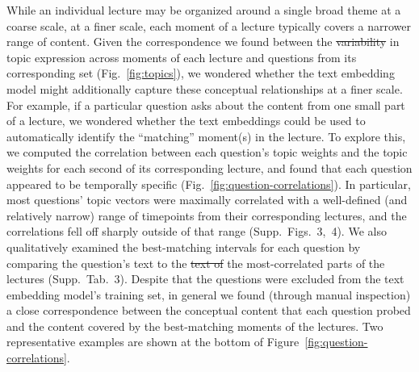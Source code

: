 \documentclass[10pt]{article}
\newcommand{\matchTab}{3}
\newcommand{\forcesCorrs}{3}
\newcommand{\bosCorrs}{4}
\providecommand{\DIFaddtex}[1]{{\protect\color{blue}\uwave{#1}}} %
\providecommand{\DIFdeltex}[1]{{\protect\color{red}\sout{#1}}}                      %
\providecommand{\DIFaddbegin}{} %
\providecommand{\DIFaddend}{} %
\providecommand{\DIFdelbegin}{} %
\providecommand{\DIFdelend}{} %
\providecommand{\DIFadd}[1]{\texorpdfstring{\DIFaddtex{#1}}{#1}} %
\providecommand{\DIFdel}[1]{\texorpdfstring{\DIFdeltex{#1}}{}} %
\newcommand{\DIFscaledelfig}{0.5}
\newlength{\DIFdelgraphicswidth} %
\newlength{\DIFdelgraphicsheight} %
\newcommand{\DIFaddincludegraphics}[2][]{{\color{blue}\fbox{\DIFOincludegraphics[#1]{#2}}}} %
\newcommand{\DIFdelincludegraphics}[2][]{%
\sbox{\DIFdelgraphicsbox}{\DIFOincludegraphics[#1]{#2}}%
\settoboxwidth{\DIFdelgraphicswidth}{\DIFdelgraphicsbox} %
\settoboxtotalheight{\DIFdelgraphicsheight}{\DIFdelgraphicsbox} %
\scalebox{\DIFscaledelfig}{%
\parbox[b]{\DIFdelgraphicswidth}{\usebox{\DIFdelgraphicsbox}\\[-\baselineskip] \rule{\DIFdelgraphicswidth}{0em}}\llap{\resizebox{\DIFdelgraphicswidth}{\DIFdelgraphicsheight}{%
\setlength{\unitlength}{\DIFdelgraphicswidth}%
\begin{picture}(1,1)%
\thicklines\linethickness{2pt} %
{\color[rgb]{1,0,0}\put(0,0){\framebox(1,1){}}}%
{\color[rgb]{1,0,0}\put(0,0){\line( 1,1){1}}}%
{\color[rgb]{1,0,0}\put(0,1){\line(1,-1){1}}}%
\end{picture}%
}\hspace*{3pt}}} %
} %
\DeclareRobustCommand{\DIFaddbegin}{\DIFOaddbegin \let\includegraphics\DIFaddincludegraphics} %
\DeclareRobustCommand{\DIFaddend}{\DIFOaddend \let\includegraphics\DIFOincludegraphics} %
\DeclareRobustCommand{\DIFdelbegin}{\DIFOdelbegin \let\includegraphics\DIFdelincludegraphics} %
\DeclareRobustCommand{\DIFdelend}{\DIFOaddend \let\includegraphics\DIFOincludegraphics} %
\begin{document}
While an individual lecture may be organized around a single broad theme at a
coarse scale, at a finer scale, each moment of a lecture typically covers a
narrower range of content. Given the correspondence we found between the
\DIFdelbegin \DIFdel{variability }\DIFdelend \DIFaddbegin \DIFadd{variabilities }\DIFaddend in topic expression across moments of each lecture and questions
from its corresponding set (Fig.~\ref{fig:topics}), we wondered whether the
text embedding model might additionally capture these conceptual relationships
at a finer scale. For example, if a particular question asks about the content
from one small part of a lecture, we wondered whether the text embeddings could
be used to automatically identify the ``matching'' moment(s) in the lecture. To
explore this, we computed the correlation between each question's topic weights
and the topic weights for each second of its corresponding lecture, and found
that each question appeared to be temporally specific
(Fig.~\ref{fig:question-correlations}). In particular, most questions' topic
vectors were maximally correlated with a well-defined (and relatively narrow)
range of timepoints from their corresponding lectures, and the correlations
fell off sharply outside of that range (Supp.~Figs.~\forcesCorrs,~\bosCorrs).
We also qualitatively examined the best-matching intervals for each question by
comparing the question's text to the \DIFdelbegin \DIFdel{text of }\DIFdelend \DIFaddbegin \DIFadd{transcribed text from }\DIFaddend the most-correlated parts of the
lectures (Supp.~Tab.~\matchTab). Despite that the questions were excluded from
the text embedding model's training set, in general we found (through manual
inspection) a close correspondence between the conceptual content that each
question probed and the content covered by the best-matching moments of the
lectures. Two representative examples are shown at the bottom of
Figure~\ref{fig:question-correlations}.
\end{document}
